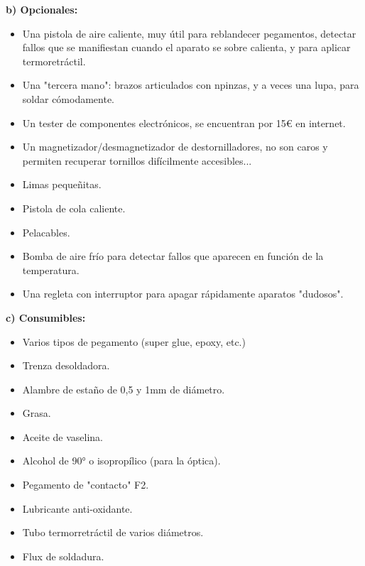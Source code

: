 \documentclass[a5paper,twoside,openany]{book}
\begin{document}
\vspace{1em}
{\large \textbf{b) Opcionales:}}
\begin{itemize}[label=\CheckmarkBold]
\setlength\itemsep{0em} %
\item Una pistola de aire caliente, muy útil para reblandecer pegamentos, detectar fallos que se manifiestan cuando el aparato se sobre calienta, y para aplicar termoretráctil.
\item Una "tercera mano": brazos articulados con npinzas, y a veces una lupa, para soldar cómodamente.
\item Un tester de componentes electrónicos, se encuentran por 15€ en internet.
\item Un magnetizador/desmagnetizador de destornilladores, no son caros y permiten recuperar tornillos difícilmente accesibles...
\item Limas pequeñitas.
\item Pistola de cola caliente.
\item Pelacables.
\item Bomba de aire frío para detectar fallos que aparecen en función de la temperatura.
\item Una regleta con interruptor para apagar rápidamente aparatos "dudosos".
\end{itemize}
\newpage

{\large \textbf{c) Consumibles:}}
\begin{itemize}[label=\CheckmarkBold]
\setlength\itemsep{0em}
\item Varios tipos de pegamento (super glue, epoxy, etc.)
\item Trenza desoldadora.
\item Alambre de estaño de 0,5 y 1mm de diámetro.
\item Grasa.
\item Aceite de vaselina.
\item Alcohol de 90° o isopropílico (para la óptica).
\item Pegamento de "contacto" F2.
\item Lubricante anti-oxidante.
\item Tubo termorretráctil de varios diámetros.
\item Flux de soldadura.
\end{itemize}
\end{document}
